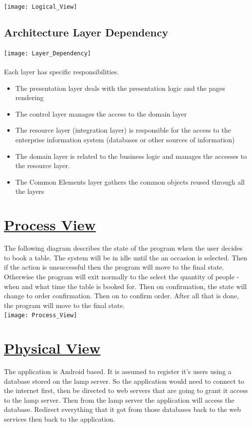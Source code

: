 \documentclass{article}
\begin{document}
\texttt{[image: Logical\_View]} 

\subsection{Architecture Layer Dependency}
\texttt{[image: Layer\_Dependency]}\\\\ Each layer has specific responsibilities.
\begin{itemize}
\item  The presentation layer deals with the presentation logic and the pages
rendering
\item The control layer manages the access to the domain layer
\item The resource layer (integration layer) is responsible for the access to the
enterprise information system (databases or other sources of information)
\item The domain layer is related to the business logic and manages the accesses
to the resource layer.
\item The Common Elements layer gathers the common objects reused through
all the layers
\end{itemize}


\pagebreak

\section{\underline{Process View}}
The following diagram describes the state of the program when the user decides to book a table. The system will be in idle until the an occasion is selected. Then if the action is unsuccessful then the
program will move to the final state. Otherwise the program will exit normally
to the select the quantity of people - when and what time the table is booked for. Then on confirmation, the state will change to order confirmation. Then on to confirm order. After all that is done,
the program will move to the final state.\\

\texttt{[image: Process\_View]}


\pagebreak
\section{\underline{Physical View }}
The application is Android based. It is assumed to register it's users using a
database stored on the lamp server. So the application would need to connect
to the internet first, then be directed to web servers that are going to grant it
access to the lamp server. Then from the lamp server the application will access
the database. Redirect everything that it got from those databases back to the
web services then back to the application.\\
\end{document}
